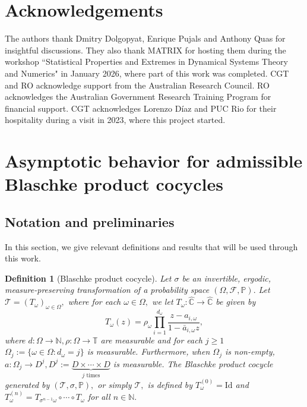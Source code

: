 \documentclass[12pt,reqno]{amsart}
\numberwithin{theorem}{section}
\newtheorem{definition}[theorem]{Definition}%
\begin{document}
\section*{Acknowledgements}

The authors thank Dmitry Dolgopyat, Enrique Pujals and Anthony Quas for insightful discussions. They also thank MATRIX for hosting them during the workshop “Statistical Properties and Extremes in Dynamical Systems Theory and Numerics" in January 2026, where part of this work was completed. CGT and RO acknowledge support from the Australian Research Council. RO acknowledges the Australian Government Research Training Program
for financial support. CGT acknowledges Lorenzo Díaz and PUC Rio for their hospitality during a visit in 2023, where this project started.


\section{Asymptotic behavior for admissible Blaschke product cocycles}\label{main_section}

\subsection{Notation and preliminaries}

In this section, we give relevant definitions and results that will be used through this work.

\begin{definition}[Blaschke product cocycle] 
Let $\sigma$ be an invertible, ergodic, measure-preserving transformation of a probability space $(\Omega, \mathcal{F}, \mathbb{P}).$ Let $\mathcal{T}=(T_{\omega})_{\omega\in\Omega},$ where
     for each $\omega\in\Omega,$ we let   $T_{\omega}:\hat{\mathbb{C}}\to\hat{\mathbb{C}}$ be given by $$T_{\omega}(z)=\rho_{\omega}\prod_{i=1}^{d_{\omega}}\frac{z-a_{i,\omega}}{1-\bar{a}_{i,\omega}z},$$ where  $d:\Omega\to\mathbb{N},\rho:\Omega\to\mathbb{T}$ are measurable and for each $j\ge1$ $\Omega_{j}:=\{\omega\in\Omega:d_{\omega}=j\}$ is measurable. Furthermore, when $\Omega_j$ is non-empty, $a:\Omega_{j}\to D^{j}, D^{j}:=\underbrace{D\times\cdots\times D}_{j \text{ times}}$ is measurable. The Blaschke product cocycle generated by $(\mathcal{T}, \sigma, \mathbb{P}),$ or simply $\mathcal{T},$ is defined by $T_{\omega}^{(0)}=\text{Id}$ and $T_{\omega}^{(n)}=T_{\sigma^{n-1}\omega}\circ\cdots\circ T_{\omega}$ for all $n\in\mathbb{N}.$
\end{definition}
\end{document}
